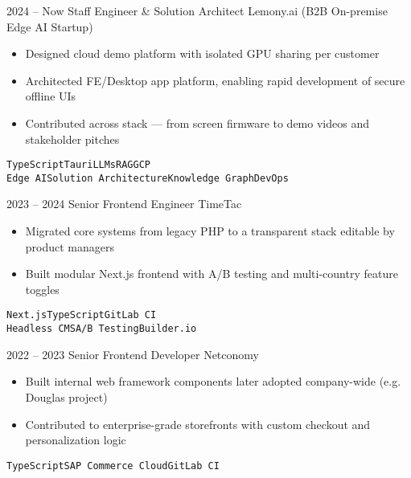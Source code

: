 \documentclass[2pt]{template}
\begin{document}
\begin{entrylist}
    \entry
    {2024 -- Now}
    {Staff Engineer \& Solution Architect}
    {Lemony.ai (B2B On-premise Edge AI Startup)}
    {
        \begin{itemize}[noitemsep,topsep=5pt,leftmargin=8pt]
            \item Designed cloud demo platform with isolated GPU sharing per customer
            \item Architected FE/Desktop app platform, enabling rapid development of secure offline UIs
            \item Contributed across stack — from screen firmware to demo videos and stakeholder pitches
        \end{itemize}
        \texttt{TypeScript}\slashsep\texttt{Tauri}\slashsep\texttt{LLMs}\slashsep\texttt{RAG}\slashsep\texttt{GCP}\\
        {\color{gray}\texttt{Edge AI}\slashsep\texttt{Solution Architecture}\slashsep\texttt{Knowledge Graph}\slashsep\texttt{DevOps}}}

    \entry
    {2023 -- 2024}
    {Senior Frontend Engineer}
    {TimeTac}
    {
        \begin{itemize}[noitemsep,topsep=5pt,leftmargin=8pt]
            \item Migrated core systems from legacy PHP to a transparent stack editable by product managers
            \item Built modular Next.js frontend with A/B testing and multi-country feature toggles
        \end{itemize}
        \texttt{Next.js}\slashsep\texttt{TypeScript}\slashsep\texttt{GitLab CI}\\
        {\color{gray}\texttt{Headless CMS}\slashsep\texttt{A/B Testing}\slashsep\texttt{Builder.io}}}

    \entry
    {2022 -- 2023}
    {Senior Frontend Developer}
    {Netconomy}
    {
        \begin{itemize}[noitemsep,topsep=5pt,leftmargin=8pt]
            \item Built internal web framework components later adopted company-wide (e.g. Douglas project)
            \item Contributed to enterprise-grade storefronts with custom checkout and personalization logic
        \end{itemize}
        \texttt{TypeScript}\slashsep\texttt{SAP Commerce Cloud}\slashsep\texttt{GitLab CI}}


\end{entrylist}
\end{document}
